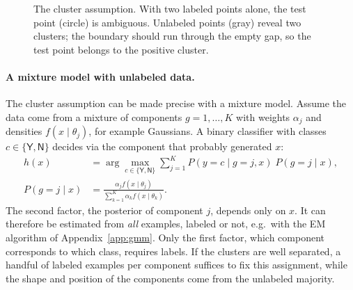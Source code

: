 \begin{figure}[ht]
  \centering
  \caption{The cluster assumption. With two labeled points alone, the test
  point (circle) is ambiguous. Unlabeled points (gray) reveal two clusters;
  the boundary should run through the empty gap, so the test point belongs
  to the positive cluster.}
  \label{fig:cluster-assumption}
\end{figure}

\paragraph{A mixture model with unlabeled data.}
The cluster assumption can be made precise with a mixture model. Assume the
data come from a mixture of components $g=1,\dots,K$ with weights
$\alpha_j$ and densities $f(x\mid\theta_j)$, for example Gaussians. A binary
classifier with classes $c\in\{\textsf{Y},\textsf{N}\}$ decides via the
component that probably generated $x$:
\begin{align}
  h(x) &= \arg\max_{c\in\{\textsf{Y},\textsf{N}\}}
    \sum_{j=1}^{K} P(y=c \mid g=j, x)\; P(g=j\mid x),
  \label{eq:ssl-mixture}\\
  P(g=j\mid x) &= \frac{\alpha_j f(x\mid\theta_j)}
    {\sum_{k=1}^{K}\alpha_k f(x\mid\theta_k)} .
  \nonumber
\end{align}
The second factor, the posterior of component $j$, depends only on $x$. It
can therefore be estimated from \emph{all} examples, labeled or not, e.g.\
with the EM algorithm of Appendix~\ref{app:gmm}. Only the first factor, which
component corresponds to which class, requires labels. If the clusters are
well separated, a handful of labeled examples per component suffices to fix
this assignment, while the shape and position of the components come from
the unlabeled majority.

